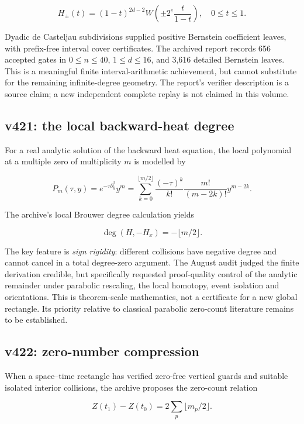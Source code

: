 \documentclass[
  10pt,
  a4paper,
  10pt,
  oneside,
  openany]{book}
\begin{document}
\[
H_\pm(t)=(1-t)^{2d-2}
W\!\left(\pm 2^e\frac{t}{1-t}\right),\quad 0\le t\le1.
\tag{S4.2}\label{eq:S4.2}
\]

Dyadic de Casteljau subdivisions supplied positive Bernstein coefficient
leaves, with prefix-free interval cover certificates. The archived
report records 656 accepted gates in \(0\le n\le40\), \(1\le d\le16\),
and 3,616 detailed Bernstein leaves. This is a meaningful finite
interval-arithmetic achievement, but cannot substitute for the remaining
infinite-degree geometry. The report's verifier description is a source
claim; a new independent complete replay is not claimed in this volume.

\subsection{v421: the local backward-heat
degree}\label{v421-the-local-backward-heat-degree}

For a real analytic solution of the backward heat equation, the local
polynomial at a multiple zero of multiplicity \(m\) is modelled by

\[
P_m(\tau,y)=e^{-\tau\partial_y^2}y^m
=\sum_{k=0}^{\lfloor m/2\rfloor}
\frac{(-\tau)^k}{k!}\frac{m!}{(m-2k)!}y^{m-2k}.
\tag{S4.3}\label{eq:S4.3}
\]

The archive's local Brouwer degree calculation yields

\[
\deg(H,-H_x)=-\lfloor m/2\rfloor.
\tag{S4.4}\label{eq:S4.4}
\]

The key feature is \emph{sign rigidity}: different collisions have
negative degree and cannot cancel in a total degree-zero argument. The
August audit judged the finite derivation credible, but specifically
requested proof-quality control of the analytic remainder under
parabolic rescaling, the local homotopy, event isolation and
orientations. This is theorem-scale mathematics, not a certificate for a
new global rectangle. Its priority relative to classical parabolic
zero-count literature remains to be established.

\subsection{v422: zero-number
compression}\label{v422-zero-number-compression}

When a space--time rectangle has verified zero-free vertical guards and
suitable isolated interior collisions, the archive proposes the
zero-count relation

\[
Z(t_1)-Z(t_0)=2\sum_{p}\lfloor m_p/2\rfloor.
\tag{S4.5}\label{eq:S4.5}
\]
\end{document}
